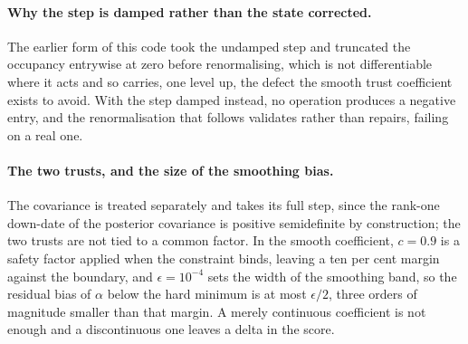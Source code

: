 \documentclass[11pt]{article}
\begin{document}
\paragraph{Why the step is damped rather than the state corrected.} The earlier form of this code
took the undamped step and truncated the occupancy entrywise at zero before renormalising, which is
not differentiable where it acts and so carries, one level up, the defect the smooth trust
coefficient exists to avoid. With the step damped instead, no operation produces a negative entry,
and the renormalisation that follows validates rather than repairs, failing on a real one.

\paragraph{The two trusts, and the size of the smoothing bias.} The covariance is treated separately
and takes its full step, since the rank-one down-date of the posterior covariance is positive
semidefinite by construction; the two trusts are not tied to a common factor. In the smooth
coefficient, $c = 0.9$ is a safety factor applied when the constraint binds, leaving a ten per cent
margin against the boundary, and $\epsilon = 10^{-4}$ sets the width of the smoothing band, so the
residual bias of $\alpha$ below the hard minimum is at most $\epsilon/2$, three orders of magnitude
smaller than that margin. A merely continuous coefficient is not enough and a discontinuous one
leaves a delta in the score.
\end{document}
